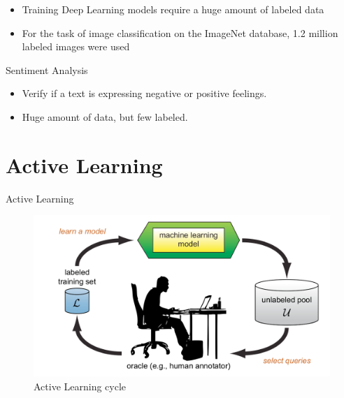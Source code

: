 \documentclass[10pt]{beamer}
\begin{document}
\begin{frame}[fragile]
\begin{itemize}
\item Training \alert{Deep Learning} models require a huge amount of labeled data
\vspace{0.5cm}
\item For the task of image classification on the ImageNet database, 1.2 million
    labeled images were used \cite{imagenet}
\end{itemize}
\end{frame}

\begin{frame}[fragile]{Sentiment Analysis}
\begin{itemize}
\item Verify if a text is expressing negative or positive feelings.
\vspace{0.5cm}
\item Huge amount of data, but few labeled.
\end{itemize}
\end{frame}

\section{Active Learning}

\begin{frame}[fragile]{Active Learning}
    \begin{figure}[htp]
        \centering
        \includegraphics[scale=0.3]{images/active_learning.png}
        \caption{Active Learning cycle \cite{active_learning}}
    \end{figure}
\end{frame}
\end{document}
